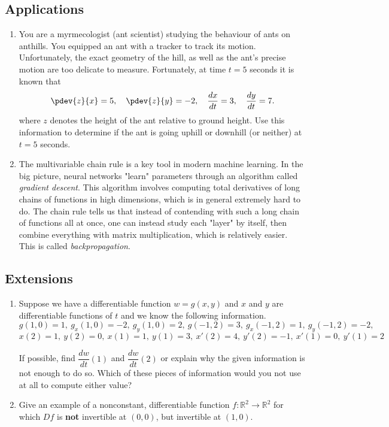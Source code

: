 \subsection*{Applications}
\begin{enumerate}[resume]
      \item You are a myrmecologist (ant scientist) studying the behaviour of ants on anthills. You equipped an ant with a tracker to track its motion. Unfortunately, the exact geometry of the hill, as well as the ant's precise motion are too delicate to measure. Fortunately, at time $t=5$ seconds it is known that
	\[ \pdev{z}{x}=5, \quad \pdev{z}{y}=-2, \quad \dfrac{dx}{dt}=3, \quad \dfrac{dy}{dt}=7. \] where $z$ denotes the height of the ant relative to ground height.
	Use this information to determine if the ant is going uphill or downhill (or neither) at $t=5$ seconds. 
    \item The multivariable chain rule is a key tool in modern machine learning. In the big picture, neural networks "learn" parameters through an algorithm called \textit{gradient descent}. This algorithm involves computing total derivatives of long chains of functions in high dimensions, which is in general extremely hard to do. The chain rule tells us that instead of contending with such a long chain of functions all at once, one can instead study each "layer" by itself, then combine everything with matrix multiplication, which is relatively easier. This is called \textit{backpropagation}. 
	
\end{enumerate}
\subsection*{Extensions}
\begin{enumerate}[resume]
    \item Suppose we have a differentiable function $w=g(x,y)$ and $x$ and $y$ are differentiable functions of $t$ and we know the following information.
	\[g(1,0)=1,\ g_x(1,0)=-2,\ g_y(1,0)=2,\ g(-1,2)=3,\ g_x(-1,2)=1,\ g_y(-1,2)=-2,\]
	\[ x(2)=1,\ y(2)=0,\ x(1)=1,\ y(1)=3,\ x'(2)=4,\ y'(2)=-1,\ x'(1)=0,\ y'(1)=2 \]
	
	If possible, find $\dfrac{dw}{dt}(1)$ and $\dfrac{dw}{dt}(2)$ or explain why the given information is not enough to do so.  Which of these pieces of information would you not use at all to compute either value?
    \item Give an example of a nonconstant, differentiable function $f:\mathbb{R}^2\to\mathbb{R}^2$ for which $Df$ is \textbf{not} invertible at $(0,0)$, but invertible at $(1,0)$.
\end{enumerate}
{}

